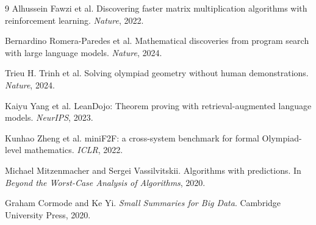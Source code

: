 \documentclass[UTF8,zihao=-4,oneside,fontset=fandol]{ctexrep}
\theoremstyle{remark}
\begin{document}
\begin{thebibliography}{9}
Alhussein Fawzi et al.
\newblock Discovering faster matrix multiplication algorithms with reinforcement learning.
\newblock \emph{Nature}, 2022.

Bernardino Romera-Paredes et al.
\newblock Mathematical discoveries from program search with large language models.
\newblock \emph{Nature}, 2024.

Trieu H. Trinh et al.
\newblock Solving olympiad geometry without human demonstrations.
\newblock \emph{Nature}, 2024.

Kaiyu Yang et al.
\newblock LeanDojo: Theorem proving with retrieval-augmented language models.
\newblock \emph{NeurIPS}, 2023.

Kunhao Zheng et al.
\newblock miniF2F: a cross-system benchmark for formal Olympiad-level mathematics.
\newblock \emph{ICLR}, 2022.

Michael Mitzenmacher and Sergei Vassilvitskii.
\newblock Algorithms with predictions.
\newblock In \emph{Beyond the Worst-Case Analysis of Algorithms}, 2020.

Graham Cormode and Ke Yi.
\newblock \emph{Small Summaries for Big Data}.
\newblock Cambridge University Press, 2020.
\end{thebibliography}
\end{document}
